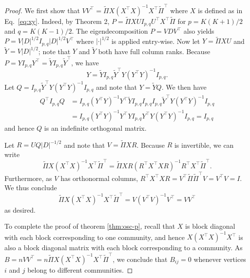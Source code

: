 \documentclass[
  11pt,
]{article}
\theoremstyle{definition}
\theoremstyle{definition}
\theoremstyle{definition}
\theoremstyle{definition}
\theoremstyle{remark}
\begin{document}
\begin{proof}
We first show that $V V^\top =
\tilde{\Pi} X (X^\top X)^{-1} X^\top \tilde{\Pi}^{\top} $ where $X$ is 
defined as in Eq.~\eqref{eq:xy}. Indeed, by Theorem 2, 
\(P = \tilde{\Pi} X U I_{p, q} U^\top X^\top \tilde{\Pi}\) for $p = K(K+1)/2$ and $q = K(K-1)/2$. 
The eigendecomposition \(P = V D V^\top\) also yields $P = V
|D|^{1/2} I_{p, q} |D|^{1/2} V^\top$ where \(|\cdot|^{1/2}\) is
applied entry-wise. Now let $Y = \tilde{\Pi} XU$ and $\tilde{Y} = V|D|^{1/2}$; note that
$Y$ and $\tilde{Y}$ both have full column ranks. 
Because $P = Y I_{p,q} Y^{\top} = \tilde{Y} I_{p,q} \tilde{Y}^{\top}$, we have
$$Y = \tilde{Y} I_{p,q} \tilde{Y}^{\top} Y (Y^{\top} Y)^{-1} I_{p,q}.$$
Let $Q = I_{p,q} \tilde{Y}^{\top} Y (Y^{\top} Y)^{-1} I_{p,q}$ and note that
$Y = \tilde{Y} Q$. We then have
\begin{equation*}
  \begin{split}
  Q^{\top} I_{p,q} Q &= I_{p,q} (Y^{\top} Y)^{-1} Y^{\top} \tilde{Y} I_{p,q}
I_{p,q} I_{p,q} \tilde{Y}^{\top} Y (Y^{\top} Y)^{-1} I_{p,q} \\ 
&= I_{p,q} (Y^{\top} Y)^{-1} Y^{\top} Y I_{p,q}
Y^{\top} Y (Y^{\top} Y)^{-1} I_{p,q} =  I_{p,q}
\end{split}
\end{equation*}
and hence $Q$ is an indefinite orthogonal matrix. 

Let $R = U Q |D|^{-1/2}$ and note that $V = \tilde{\Pi} XR$. Because $R$ is
invertible, we can write
$$\tilde{\Pi} X (X^{\top} X)^{-1} X^{\top} \tilde{\Pi}^{\top} =
\tilde{\Pi} X R (R^{\top} X^{\top} X R)^{-1}
R^{\top} X^{\top} \tilde{\Pi}^{\top}.$$ 
Furthermore, as $V$ has orthonormal columns, $R^{\top} X^{\top} X R =
V^{\top} \tilde{\Pi} \tilde{\Pi}^{\top} V = V^{\top} V = I$. We thus conclude
$$\tilde{\Pi} X (X^{\top} X)^{-1} X^{\top} \tilde{\Pi}^{\top} = V (V^{\top} V)^{-1} V^{\top} = V V^{\top}$$
as desired.

To complete the proof of theorem \ref{thm:osc-p}, recall that \(X\) 
is block diagonal with each block corresponding to one community, 
and hence \(X (X^\top X)^{-1} X^\top\) is also a
block diagonal matrix with each block corresponding to a community. 
As $B = n VV^{\top} = n \tilde{\Pi} X (X^\top X)^{-1} X^\top \tilde{\Pi}^{\top}$, 
we conclude that $B_{ij} = 0$ 
whenever vertices $i$ and $j$ belong to different communities.  
\end{proof}
\end{document}
